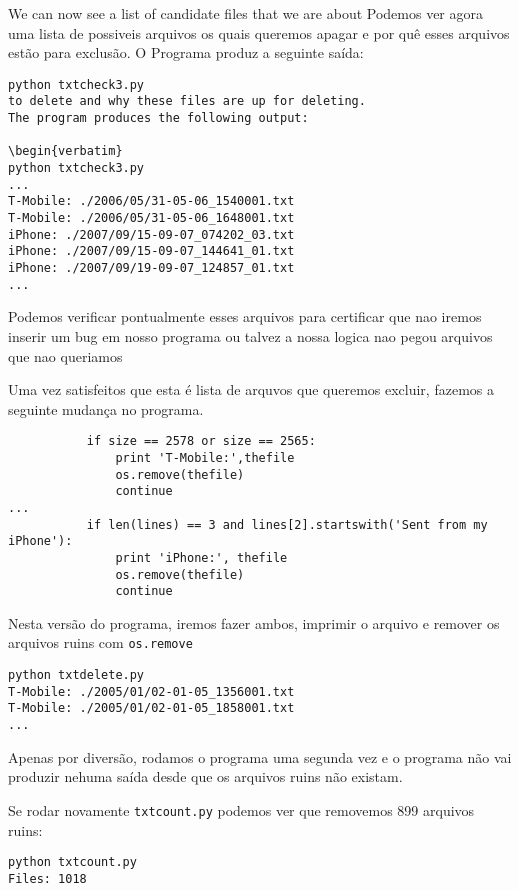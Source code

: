 \documentclass{book}
\begin{document}
We can now see a list of candidate files that we are about
Podemos ver agora uma lista de possiveis arquivos os quais queremos apagar e por quê esses arquivos estão
para exclusão.
O Programa produz a seguinte saída:

\begin{verbatim}
python txtcheck3.py
to delete and why these files are up for deleting.
The program produces the following output:

\begin{verbatim}
python txtcheck3.py
...
T-Mobile: ./2006/05/31-05-06_1540001.txt
T-Mobile: ./2006/05/31-05-06_1648001.txt
iPhone: ./2007/09/15-09-07_074202_03.txt
iPhone: ./2007/09/15-09-07_144641_01.txt
iPhone: ./2007/09/19-09-07_124857_01.txt
...
\end{verbatim}

%
Podemos verificar pontualmente esses arquivos para certificar que nao iremos inserir um bug em nosso programa
ou talvez a nossa logica nao pegou arquivos que nao queriamos

Uma vez satisfeitos que esta é lista de arquvos que queremos excluir, fazemos a seguinte mudança no programa.

\begin{verbatim}
           if size == 2578 or size == 2565:
               print 'T-Mobile:',thefile
               os.remove(thefile)
               continue
...
           if len(lines) == 3 and lines[2].startswith('Sent from my iPhone'):
               print 'iPhone:', thefile
               os.remove(thefile)
               continue
\end{verbatim}
%

Nesta versão do programa, iremos fazer ambos, imprimir o arquivo e remover os arquivos ruins com {\tt os.remove}

\begin{verbatim}
python txtdelete.py 
T-Mobile: ./2005/01/02-01-05_1356001.txt
T-Mobile: ./2005/01/02-01-05_1858001.txt
...
\end{verbatim}
%
Apenas por diversão, rodamos o programa uma segunda vez e o programa não vai produzir nehuma saída desde que os arquivos ruins
não existam.


Se rodar novamente {\tt txtcount.py} podemos ver que removemos 899 arquivos ruins:

\begin{verbatim}
python txtcount.py 
Files: 1018
\end{verbatim}

%
\end{document}
